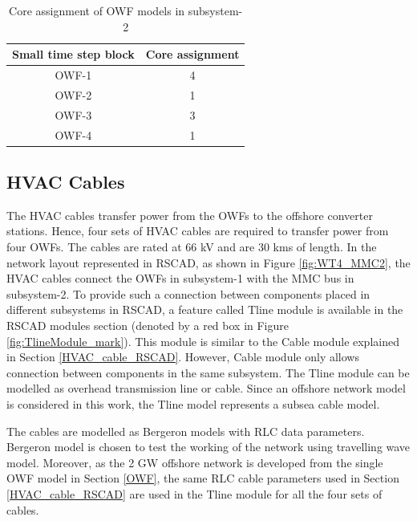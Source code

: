 \begin{table}[H]
\centering
\begin{tabular}{|c|c|}
\hline
\textbf{Small time step block} & \textbf{Core assignment} \\ \hline
OWF-1                          & 4                        \\ \hline
OWF-2                          & 1                        \\ \hline
OWF-3                          & 3                        \\ \hline
OWF-4                          & 1                        \\ \hline
\end{tabular}
\caption{Core assignment of OWF models in subsystem-2}
\label{tab:Core_assignment_sub2}
\end{table}

\subsection{HVAC Cables}\label{Tline_cable_RSCAD}
The \gls{HVAC} cables transfer power from the \gls{OWF}s to the offshore converter stations. Hence, four sets of \gls{HVAC} cables are required to transfer power from four \gls{OWF}s. The cables are rated at 66 kV and are 30 kms of length. In the network layout represented in RSCAD, as shown in Figure \ref{fig:WT4_MMC2}, the \gls{HVAC} cables connect the \gls{OWF}s in subsystem-1 with the \gls{MMC} bus in subsystem-2. To provide such a connection between components placed in different subsystems in RSCAD, a feature called Tline module is available in the RSCAD modules section (denoted by a red box in Figure \ref{fig:TlineModule_mark}). This module is similar to the Cable module explained in Section \ref{HVAC_cable_RSCAD}. However, Cable module only allows connection between components in the same subsystem. The Tline module can be modelled as overhead transmission line or cable. Since an offshore network model is considered in this work, the Tline model represents a subsea cable model. 

The cables are modelled as Bergeron models with RLC data parameters. Bergeron model is chosen to test the working of the network using travelling wave model. Moreover, as the 2 GW offshore network is developed from the single \gls{OWF} model in Section \ref{OWF}, the same RLC cable parameters used in Section \ref{HVAC_cable_RSCAD} are used in the Tline module for all the four sets of cables. 
 
